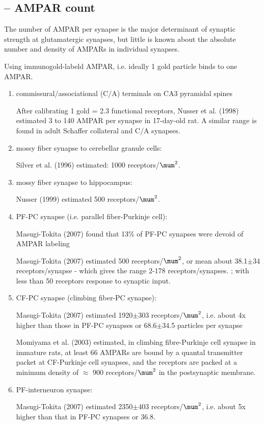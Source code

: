 \subsection{-- AMPAR count}
\label{sec:AMPAR-count}

The number of AMPAR per synapse is the major determinant of synaptic strength at
glutamatergic synapses, but little is known about the absolute number and
density of AMPARs in individual synapses.

Using immunogold-labeld AMPAR, i.e. ideally 1 gold particle binds to one AMPAR.

\begin{enumerate}
  
  \item commissural/associational (C/A) terminals on CA3 pyramidal spines
  
  After calibrating 1 gold = 2.3 functional receptors, Nusser et al. (1998)
  estimated 3 to 140 AMPAR per synapse in 17-day-old rat.
  A similar range is found in adult Schaffer collateral and C/A synapses.
  
  \item mossy fiber synapse to cerebellar granule cells:
  
  Silver et al. (1996) estimated: 1000 receptors/$\mum^2$.
  
  \item mossy fiber synapse to hippocampus:
  
  Nusser (1999) estimated 500 receptors/$\mum^2$.
  
  
  \item PF-PC synapse (i.e. parallel fiber-Purkinje cell): 
  
  Masugi-Tokita (2007) found that 13\% of PF-PC synapses were devoid of AMPAR
  labeling
  
  Masugi-Tokita (2007) estimated 500 receptors/$\mum^2$, or mean about
  38.1$\pm$34 receptors/synapse - which gives the range
  2-178 receptors/synapses. ; with less than 50 receptors response to synaptic
  input.

  \item CF-PC synapse (climbing fiber-PC synapse): 
  
  Masugi-Tokita (2007) estimated 1920$\pm303$ receptors/$\mum^2$, i.e. about 4x
  higher than those in PF-PC synapses or 68.6$\pm$34.5 particles per synapse
  
  Momiyama et al. (2003) estimated, in climbing fibre-Purkinje cell synapse in
  immature rats, at least 66 AMPARs are bound by a quantal transmitter packet at
  CF-Purkinje cell synapses, and the receptors are packed at a minimum density
  of $\approx$ 900 receptors/$\mum^2$ in the postsynaptic membrane. 
  
  \item PF-interneuron synapse:
  
  Masugi-Tokita (2007) estimated 2350$\pm403$ receptors/$\mum^2$, i.e. about 5x
  higher than that in PF-PC synapses or 36.8. 
    
\end{enumerate}



